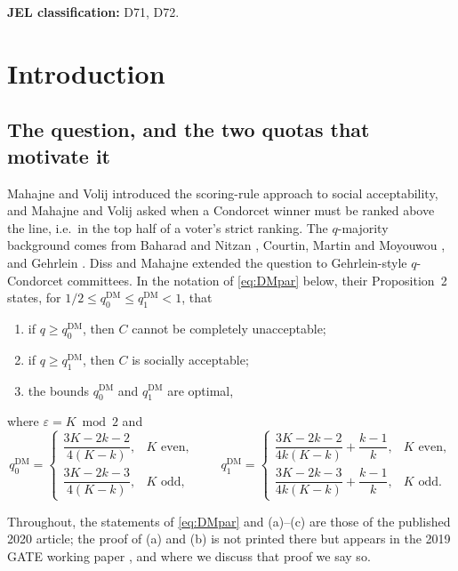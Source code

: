 \documentclass[11pt]{article}
\theoremstyle{plain}
\theoremstyle{definition}
\newcommand{\eps}{\varepsilon}
\newcommand{\DM}{\mathrm{DM}}
\begin{document}
\noindent\textbf{JEL classification:} D71, D72.

\bigskip

\section{Introduction}
\label{sec:intro}

\subsection{The question, and the two quotas that motivate it}

Mahajne and Volij \cite{MahajneVolij2018} introduced the scoring-rule approach to social acceptability, and Mahajne and Volij \cite{MahajneVolij2019} asked when a Condorcet winner must be ranked above the line, i.e.\ in the top half of a voter's strict ranking. The $q$-majority background comes from Baharad and Nitzan \cite{BaharadNitzan2003}, Courtin, Martin and Moyouwou \cite{CourtinEtAl2015}, and Gehrlein \cite{Gehrlein1985}. Diss and Mahajne \cite{DissMahajne2020} extended the question to Gehrlein-style $q$-Condorcet committees. In the notation of \eqref{eq:DMpar} below, their Proposition~2 states, for $1/2\le q_0^{\DM}\le q_1^{\DM}<1$, that

\begin{enumerate}[label=(\alph*)]
\item if $q\ge q_0^{\DM}$, then $C$ cannot be completely unacceptable;
\item if $q\ge q_1^{\DM}$, then $C$ is socially acceptable;
\item the bounds $q_0^{\DM}$ and $q_1^{\DM}$ are optimal,
\end{enumerate}

where $\eps=K\bmod 2$ and
\begin{equation}
\label{eq:DMpar}
q_0^{\DM}=
\begin{cases}
\dfrac{3K-2k-2}{4(K-k)}, & K \text{ even},\\[8pt]
\dfrac{3K-2k-3}{4(K-k)}, & K \text{ odd},
\end{cases}
\qquad
q_1^{\DM}=
\begin{cases}
\dfrac{3K-2k-2}{4k(K-k)}+\dfrac{k-1}{k}, & K \text{ even},\\[8pt]
\dfrac{3K-2k-3}{4k(K-k)}+\dfrac{k-1}{k}, & K \text{ odd}.
\end{cases}
\end{equation}

Throughout, the statements of \eqref{eq:DMpar} and (a)--(c) are those of the published 2020 article; the proof of (a) and (b) is not printed there but appears in the 2019 GATE working paper \cite{DissMahajne2019}, and where we discuss that proof we say so.
\end{document}
